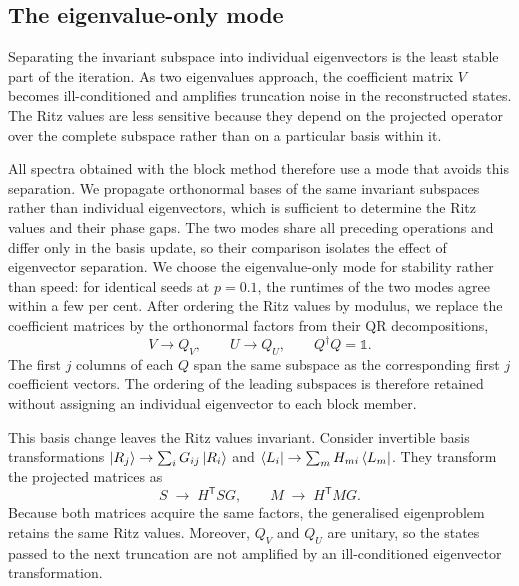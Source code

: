 \subsection{The eigenvalue-only mode}
\label{app:blockpm:schur}

Separating the invariant subspace into individual eigenvectors is the least stable part of the iteration. As two eigenvalues approach, the coefficient matrix $V$ becomes ill-conditioned and amplifies truncation noise in the reconstructed states. The Ritz values are less sensitive because they depend on the projected operator over the complete subspace rather than on a particular basis within it.

All spectra obtained with the block method therefore use a mode that avoids this separation. We propagate orthonormal bases of the same invariant subspaces rather than individual eigenvectors, which is sufficient to determine the Ritz values and their phase gaps. The two modes share all preceding operations and differ only in the basis update, so their comparison isolates the effect of eigenvector separation. We choose the eigenvalue-only mode for stability rather than speed: for identical seeds at $p=0.1$, the runtimes of the two modes agree within a few per cent. After ordering the Ritz values by modulus, we replace the coefficient matrices by the orthonormal factors from their QR decompositions,
\begin{equation}
  V \to Q_V, \qquad U \to Q_U, \qquad Q^{\dagger}Q = \mathbb{1}.
  \label{eq:app:blockpm:qr}
\end{equation}
The first $j$ columns of each $Q$ span the same subspace as the corresponding first $j$ coefficient vectors. The ordering of the leading subspaces is therefore retained without assigning an individual eigenvector to each block member.

This basis change leaves the Ritz values invariant. Consider invertible basis transformations $\ket{R_j}\to\sum_i G_{ij}\ket{R_i}$ and $\bra{L_i}\to\sum_m H_{mi}\bra{L_m}$. They transform the projected matrices as
\begin{equation}
  S \;\to\; H^{\mathsf T} S G,
  \qquad
  M \;\to\; H^{\mathsf T} M G .
  \label{eq:app:blockpm:congruence}
\end{equation}
Because both matrices acquire the same factors, the generalised eigenproblem retains the same Ritz values. Moreover, $Q_V$ and $Q_U$ are unitary, so the states passed to the next truncation are not amplified by an ill-conditioned eigenvector transformation.

